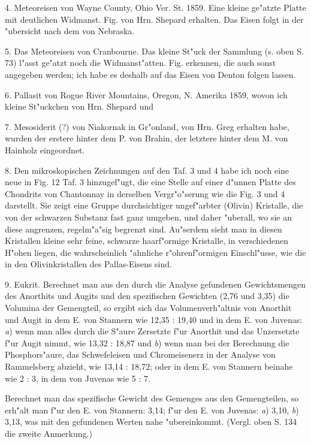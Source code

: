 \documentclass[a4paper, 11pt, oneside]{article}
\begin{document}
4. Meteoreisen von Wayne County, Ohio Ver. St. 1859. Eine kleine ge"atzte Platte mit deutlichen Widmanst. Fig. von Hrn. Shepard erhalten. Das Eisen folgt in der "ubersicht nach dem von Nebraska.

5. Das Meteoreisen von Cranbourne. Das kleine St"uck der Sammlung (s. oben S. 73) l"asst ge"atzt noch die Widmanst"atten. Fig. erkennen, die auch sonst angegeben werden; ich habe es deshalb auf das Eisen von Denton folgen lassen.

6. Pallasit von Rogue River Mountains, Oregon, N. Amerika 1859, wovon ich kleine St"uckchen von Hrn. Shepard und

7. Mesosiderit (?) von Niakornak in Gr"onland, von Hrn. Greg erhalten habe, wurden der erstere hinter dem P. von Brahin, der letztere hinter dem M. von Hainholz eingeordnet.

8. Den mikroskopischen Zeichnungen auf den Taf. 3 und 4 habe ich noch eine neue in Fig. 12 Taf. 3 hinzugef"ugt, die eine Stelle auf einer d"unnen Platte des Chondrits von Chantonnay in derselben Vergr"o"serung wie die Fig. 3 und 4 darstellt. Sie zeigt eine Gruppe durchsichtiger ungef"arbter (Olivin) Kristalle, die von der schwarzen Substanz fast ganz umgeben, und daher "uberall, wo sie an diese angrenzen, regelm"a"sig begrenzt sind. Au"serdem sieht man in diesen Kristallen kleine sehr feine, schwarze haarf"ormige Kristalle, in verschiedenen H"ohen liegen, die wahrscheinlich "ahnliche r"ohrenf"ormigen Einschl"usse, wie die in den Olivinkristallen des Pallas-Eisens sind.

9. Eukrit. Berechnet man aus den durch die Analyse gefundenen Gewichtsmengen des Anorthits und Augits und den spezifischen Gewichten (2,76 und 3,35) die Volumina der Gemengteil, so ergibt sich das Volumenverh"altnis von Anorthit und Augit in dem E. von Stannern wie 12,35 : 19,40 und in dem E. von Juvenas: \emph{a}) wenn man alles durch die S"aure Zersetzte f"ur Anorthit und das Unzersetzte f"ur Augit nimmt, wie 13,32 : 18,87 und \emph{b}) wenn man bei der Berechnung die Phosphors"aure, das Schwefeleisen und Chromeisenerz in der Analyse von Rammelsberg abzieht, wie 13,14 : 18,72; oder in dem E. von Stannern beinahe wie 2 : 3, in dem von Juvenas wie 5 : 7.

Berechnet man das spezifische Gewicht des Gemenges aus den Gemengteilen, so erh"alt man f"ur den E. von Stannern: 3,14; f"ur den E. von Juvenas: \emph{a}) 3,10, \emph{b}) 3,13, was mit den gefundenen Werten nahe "ubereinkommt. (Vergl. oben S. 134 die zweite Anmerkung.)
\end{document}
